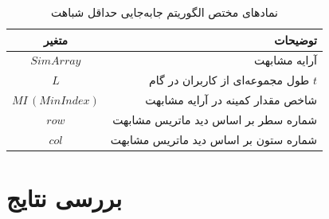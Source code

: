 \begin{LTR}
	\begin{algorithm}[t]
		\begin{RTL}
			\caption{%
				جابه‌جایی حداقل شباهت
			}
			\label{algo_min_similarity_swapping}
		\end{RTL}
		
		\begin{latin}
		\end{latin}
	\end{algorithm}
\end{LTR}


\begin{table}[h]
	\centering
	\caption{نمادهای مختص الگوریتم جابه‌جایی حداقل شباهت}
	\label{tabel_MinSimilaritySwapNotations}
	\begin{tabular}{cr}
		\hline
		متغیر & توضیحات \\
		\hline
		$SimArray$ & آرایه مشابهت \\
		$L$ & طول مجموعه‌ای از کاربران در گام $t$ \\
		$MI \, (MinIndex)$ & شاخص مقدار کمینه در آرایه مشابهت \\
		$row$ & شماره سطر بر اساس دید ماتریس مشابهت \\
		$col$ & شماره ستون بر اساس دید ماتریس مشابهت
	\end{tabular}
\end{table}








\section{بررسی نتایج}
